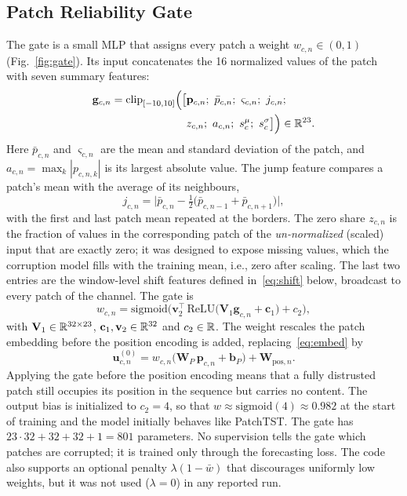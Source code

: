 \subsection{Patch Reliability Gate}
\label{sec:method-gate}

The gate is a small MLP that assigns every patch a weight $w_{c,n}\in(0,1)$ (Fig.~\ref{fig:gate}). Its input concatenates the 16 normalized values of the patch with seven summary features:
\begin{equation}
\begin{split}
\mathbf{g}_{c,n}=\mathrm{clip}_{[-10,10]}\Big(\big[&\mathbf{p}_{c,n};\ \bar{p}_{c,n};\ \varsigma_{c,n};\ j_{c,n};\\
&z_{c,n};\ a_{c,n};\ s^{\mu}_c;\ s^{\sigma}_c\big]\Big)\in\R^{23}.
\end{split}
\label{eq:gatein}
\end{equation}
Here $\bar{p}_{c,n}$ and $\varsigma_{c,n}$ are the mean and standard deviation of the patch, and $a_{c,n}=\max_k|p_{c,n,k}|$ is its largest absolute value. The jump feature compares a patch's mean with the average of its neighbours,
\begin{equation}
j_{c,n}=\Big|\bar{p}_{c,n}-\tfrac12\big(\bar{p}_{c,n-1}+\bar{p}_{c,n+1}\big)\Big|,
\label{eq:jump}
\end{equation}
with the first and last patch mean repeated at the borders. The zero share $z_{c,n}$ is the fraction of values in the corresponding patch of the \emph{un-normalized} (scaled) input that are exactly zero; it was designed to expose missing values, which the corruption model fills with the training mean, i.e., zero after scaling. The last two entries are the window-level shift features defined in~\eqref{eq:shift} below, broadcast to every patch of the channel. The gate is
\begin{equation}
w_{c,n}=\mathrm{sigmoid}\Big(\mathbf{v}_2^{\top}\,\mathrm{ReLU}\big(\mathbf{V}_1\mathbf{g}_{c,n}+\mathbf{c}_1\big)+c_2\Big),
\label{eq:gate}
\end{equation}
with $\mathbf{V}_1\in\mathbb{R}^{32\times23}$, $\mathbf{c}_1,\mathbf{v}_2\in\mathbb{R}^{32}$ and $c_2\in\mathbb{R}$. The weight rescales the patch embedding before the position encoding is added, replacing~\eqref{eq:embed} by
\begin{equation}
\mathbf{u}^{(0)}_{c,n}=w_{c,n}\big(\mathbf{W}_P\,\mathbf{p}_{c,n}+\mathbf{b}_P\big)+\mathbf{W}_{\mathrm{pos},n}.
\label{eq:gated}
\end{equation}
Applying the gate before the position encoding means that a fully distrusted patch still occupies its position in the sequence but carries no content. The output bias is initialized to $c_2=4$, so that $w\approx\mathrm{sigmoid}(4)\approx0.982$ at the start of training and the model initially behaves like PatchTST. The gate has $23\cdot32+32+32+1=801$ parameters. No supervision tells the gate which patches are corrupted; it is trained only through the forecasting loss. The code also supports an optional penalty $\lambda(1-\bar{w})$ that discourages uniformly low weights, but it was not used ($\lambda=0$) in any reported run.

